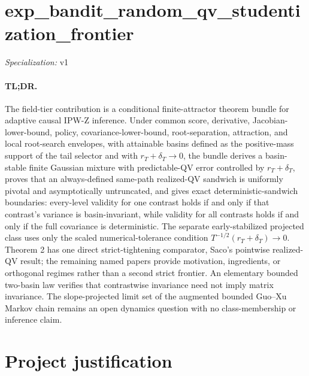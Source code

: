 \documentclass{article}
\begin{document}
\sloppy

\section*{exp\_\allowbreak{}bandit\_\allowbreak{}random\_\allowbreak{}qv\_\allowbreak{}studentization\_\allowbreak{}frontier}

\noindent\textit{Specialization:} v1\par

\paragraph{TL;DR.} The field-tier contribution is a conditional finite-attractor theorem bundle for adaptive causal IPW-Z inference. Under common score, derivative, Jacobian-lower-bound, policy, covariance-lower-bound, root-separation, attraction, and local root-search envelopes, with attainable basins defined as the positive-mass support of the tail selector and with \(r_T+\delta_T\to0\), the bundle derives a basin-stable finite Gaussian mixture with predictable-QV error controlled by \(r_T+\delta_T\), proves that an always-defined same-path realized-QV sandwich is uniformly pivotal and asymptotically untruncated, and gives exact deterministic-sandwich boundaries: every-level validity for one contrast holds if and only if that contrast's variance is basin-invariant, while validity for all contrasts holds if and only if the full covariance is deterministic. The separate early-stabilized projected class uses only the scaled numerical-tolerance condition \(T^{-1/2}(r_T+\delta_T)\to0\). Theorem 2 has one direct strict-tightening comparator, Saco's pointwise realized-QV result; the remaining named papers provide motivation, ingredients, or orthogonal regimes rather than a second strict frontier. An elementary bounded two-basin law verifies that contrastwise invariance need not imply matrix invariance. The slope-projected limit set of the augmented bounded Guo--Xu Markov chain remains an open dynamics question with no class-membership or inference claim.

\section{Project justification}
\end{document}
